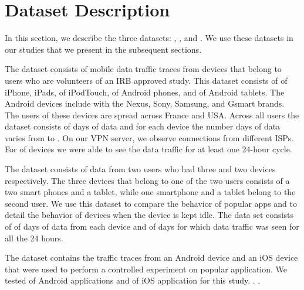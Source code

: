 \section{Dataset Description}
\label{sec:dataset}

In this section, we describe the three datasets: \moball, \mobcomp, and \mobexpt. We use these datasets in our studies that we present in the subsequent sections.

The \moball dataset consists of mobile data traffic traces from  devices that belong to  users who are volunteers of an IRB approved study. This dataset consists of  of iPhone,  iPads,  of iPodTouch,  of Android phones, and  of Android tablets. The Android devices include with the Nexus, Sony, Samsung, and Gsmart brands. The users of these devices are spread across France and USA. Across all users the dataset consists of  days of data and for each device the number days of data varies from  to . On our VPN server, we observe connections from  different ISPs. For  of devices we were able to see the data traffic for at least one 24-hour cycle. 

The \mobcomp dataset consists of data from two users who had three and two devices respectively. The three devices that belong to one of the two users consists of a two smart phones and a tablet, while one smartphone and a tablet belong to the second user. We use this dataset to compare the behavior of popular apps and to detail the behavior of devices when the device is kept idle. The data set consists of  of days of data from each device and  of days for which data traffic was seen for all the 24 hours. 

The \mobexpt dataset contains the traffic traces from an Android device and an iOS device that were used to perform a controlled experiment on popular application. We tested  of Android applications and  of iOS application for this study. .  .
